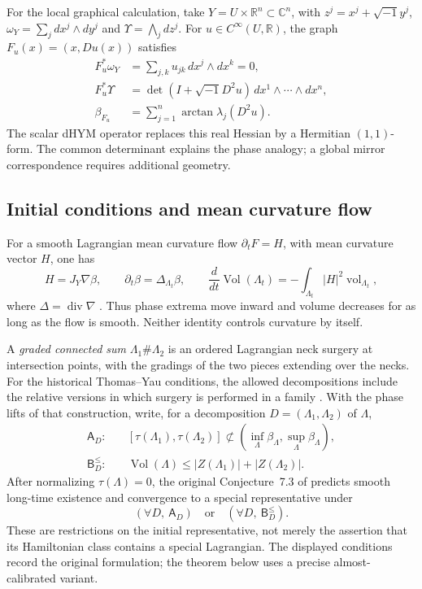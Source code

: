 \documentclass[12pt,reqno]{amsart}
\numberwithin{equation}{section}
\theoremstyle{plain}
\theoremstyle{definition}
\newcommand{\R}{\mathbb R}
\newcommand{\C}{\mathbb C}
\begin{document}
For the local graphical calculation, take
$Y=U\times\R^n\subset\C^n$, with $z^j=x^j+\sqrt{-1}y^j$,
$\omega_Y=\sum_j dx^j\wedge dy^j$ and
$\Upsilon=\bigwedge_j dz^j$. For $u\in C^\infty(U,\R)$, the graph
$F_u(x)=(x,Du(x))$ satisfies
\begin{align}
 F_u^*\omega_Y
 &=\sum_{j,k}u_{jk}\,dx^j\wedge dx^k=0,\nonumber\\
 F_u^*\Upsilon
 &=\det(I+\sqrt{-1}D^2u)\,dx^1\wedge\cdots\wedge dx^n,\nonumber\\
 \beta_{F_u}&=\sum_{j=1}^n\arctan\lambda_j(D^2u).
 \label{graph-phase-calculation}
\end{align}
The scalar dHYM operator replaces this real Hessian by a Hermitian
$(1,1)$-form. The common determinant explains the phase analogy;
a global mirror correspondence requires additional geometry.

\subsection{Initial conditions and mean curvature flow}
For a smooth Lagrangian mean curvature flow
$\partial_tF=H$, with mean curvature vector $H$, one has
\begin{equation}\label{Lagrangian-flow-identities}
 H=J_Y\nabla\beta,\qquad
 \partial_t\beta=\Delta_{\Lambda_t}\beta,\qquad
 \frac{d}{dt}\operatorname{Vol}(\Lambda_t)
 =-\int_{\Lambda_t}|H|^2\operatorname{vol}_{\Lambda_t},
\end{equation}
where $\Delta=\operatorname{div}\nabla$ \cite[Section 2]{TY02}.
Thus phase extrema move inward and volume decreases for as long as the
flow is smooth. Neither identity controls curvature by itself.

A \emph{graded connected sum} $\Lambda_1\#\Lambda_2$ is an ordered
Lagrangian neck surgery at intersection points, with the gradings of
the two pieces extending over the necks. For the historical
Thomas--Yau conditions, the allowed decompositions include the relative
versions in which surgery is performed in a family
\cite[Sections 3 and 7]{TY02}. With the phase lifts of that construction,
write, for a decomposition $D=(\Lambda_1,\Lambda_2)$ of $\Lambda$,
\begin{align}
 \mathsf A_D:
 &\quad [\tau(\Lambda_1),\tau(\Lambda_2)]
       \not\subset
       (\inf_\Lambda\beta_\Lambda,\sup_\Lambda\beta_\Lambda),
       \label{TY-phase-test}\\
 \mathsf B_D^{\leq}:
 &\quad \operatorname{Vol}(\Lambda)
       \leq |Z(\Lambda_1)|+|Z(\Lambda_2)|.
       \label{TY-volume-test}
\end{align}
After normalizing $\tau(\Lambda)=0$, the original Conjecture~7.3 of
\cite{TY02} predicts smooth long-time existence and convergence to a
special representative under
\[
 (\forall D,\ \mathsf A_D)
 \quad\text{or}\quad
 (\forall D,\ \mathsf B_D^{\leq}).
\]
These are restrictions on the initial representative, not merely the
assertion that its Hamiltonian class contains a special Lagrangian.
The displayed conditions record the original formulation; the theorem
below uses a precise almost-calibrated variant.
\end{document}
